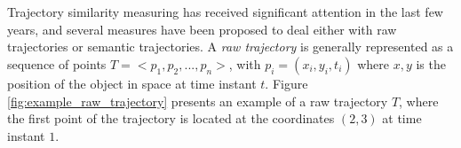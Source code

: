 


%


\chapter{}
Trajectory similarity measuring has received significant attention in the last few years, and several measures have been proposed to deal either with raw trajectories or semantic trajectories. A \emph{raw trajectory} is generally represented as a sequence of points $T=<p_1, p_2, ...,p_n>$, with $p_i=(x_i,y_i,t_i)$ where $x,y$ is the position of the object in space at time instant $t$. Figure {\ref{fig:example_raw_trajectory}} presents an example of a raw trajectory $T$, where the first point of the trajectory is located at the coordinates $(2,3)$ at time instant $1$.

